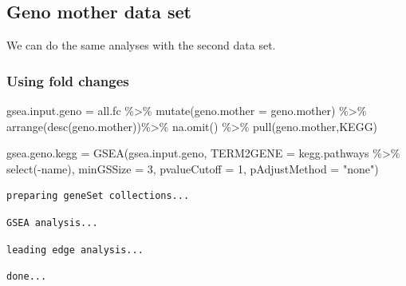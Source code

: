 \documentclass[
  24px,
  letterpaper,
  DIV=11,
  numbers=noendperiod]{scrartcl}
\newenvironment{Shaded}{\begin{snugshade}}{\end{snugshade}}
\newcommand{\AttributeTok}[1]{\textcolor[rgb]{0.40,0.45,0.13}{#1}}
\newcommand{\DecValTok}[1]{\textcolor[rgb]{0.68,0.00,0.00}{#1}}
\newcommand{\FunctionTok}[1]{\textcolor[rgb]{0.28,0.35,0.67}{#1}}
\newcommand{\NormalTok}[1]{\textcolor[rgb]{0.00,0.23,0.31}{#1}}
\newcommand{\OtherTok}[1]{\textcolor[rgb]{0.00,0.23,0.31}{#1}}
\newcommand{\SpecialCharTok}[1]{\textcolor[rgb]{0.37,0.37,0.37}{#1}}
\newcommand{\StringTok}[1]{\textcolor[rgb]{0.13,0.47,0.30}{#1}}
\begin{document}
\hypertarget{geno-mother-data-set}{%
\subsection{Geno mother data set}\label{geno-mother-data-set}}

We can do the same analyses with the second data set.

\hypertarget{using-fold-changes-1}{%
\subsubsection{Using fold changes}\label{using-fold-changes-1}}

\begin{Shaded}
\begin{Highlighting}[]
\NormalTok{gsea.input.geno }\OtherTok{=}\NormalTok{ all.fc }\SpecialCharTok{\%\textgreater{}\%}
  \FunctionTok{mutate}\NormalTok{(}\AttributeTok{geno.mother =}\NormalTok{ geno.mother) }\SpecialCharTok{\%\textgreater{}\%} 
  \FunctionTok{arrange}\NormalTok{(}\FunctionTok{desc}\NormalTok{(geno.mother))}\SpecialCharTok{\%\textgreater{}\%} \FunctionTok{na.omit}\NormalTok{() }\SpecialCharTok{\%\textgreater{}\%}
  \FunctionTok{pull}\NormalTok{(geno.mother,KEGG) }

\NormalTok{gsea.geno.kegg }\OtherTok{=} \FunctionTok{GSEA}\NormalTok{(gsea.input.geno, }
                      \AttributeTok{TERM2GENE =}\NormalTok{ kegg.pathways }\SpecialCharTok{\%\textgreater{}\%} \FunctionTok{select}\NormalTok{(}\SpecialCharTok{{-}}\NormalTok{name),}
                      \AttributeTok{minGSSize =} \DecValTok{3}\NormalTok{, }
                      \AttributeTok{pvalueCutoff =} \DecValTok{1}\NormalTok{, }
                      \AttributeTok{pAdjustMethod =} \StringTok{"none"}\NormalTok{)}
\end{Highlighting}
\end{Shaded}

\begin{verbatim}
preparing geneSet collections...
\end{verbatim}

\begin{verbatim}
GSEA analysis...
\end{verbatim}

\begin{verbatim}
leading edge analysis...
\end{verbatim}

\begin{verbatim}
done...
\end{verbatim}
\end{document}
